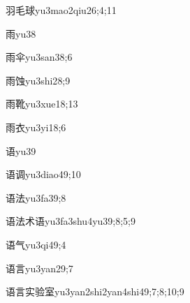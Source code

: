 \begin{verbete}{羽毛球}{yu3mao2qiu2}{6;4;11}
\end{verbete}

\begin{verbete}{雨}{yu3}{8}
\end{verbete}

\begin{verbete}{雨伞}{yu3san3}{8;6}
\end{verbete}

\begin{verbete}{雨蚀}{yu3shi2}{8;9}
\end{verbete}

\begin{verbete}{雨靴}{yu3xue1}{8;13}
\end{verbete}

\begin{verbete}{雨衣}{yu3yi1}{8;6}
\end{verbete}

\begin{verbete}{语}{yu3}{9}
\end{verbete}

\begin{verbete}{语调}{yu3diao4}{9;10}
\end{verbete}

\begin{verbete}{语法}{yu3fa3}{9;8}
\end{verbete}

\begin{verbete}{语法术语}{yu3fa3shu4yu3}{9;8;5;9}
\end{verbete}

\begin{verbete}{语气}{yu3qi4}{9;4}
\end{verbete}

\begin{verbete}{语言}{yu3yan2}{9;7}
\end{verbete}

\begin{verbete}{语言实验室}{yu3yan2shi2yan4shi4}{9;7;8;10;9}
\end{verbete}

